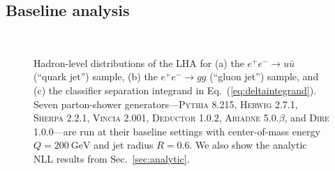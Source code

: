 \documentclass[11pt,letterpaper]{article}
\newcommand{\GeV}{\text{GeV}}
\DeclareRobustCommand{\Sec}[1]{Sec.~\ref{#1}}
\DeclareRobustCommand{\Eq}[1]{Eq.~(\ref{#1})}
\begin{document}
\subsection{Baseline analysis}

\begin{figure}
\centering
{}
$\qquad$

\caption{Hadron-level distributions of the LHA for (a) the $e^+ e^- \to u \bar{u}$ (``quark jet'') sample, (b) the $e^+ e^- \to gg$ (``gluon jet'') sample, and (c) the classifier separation integrand in \Eq{eq:deltaintegrand}.  Seven parton-shower generators---\textsc{Pythia 8.215}, \textsc{Herwig 2.7.1}, \textsc{Sherpa 2.2.1}, \textsc{Vincia 2.001}, \textsc{Deductor 1.0.2}, \textsc{Ariadne 5.0.$\beta$}, and \textsc{Dire 1.0.0}---are run at their baseline settings with center-of-mass energy $Q = 200~\GeV$ and jet radius $R= 0.6$.  We also show the analytic NLL results from \Sec{sec:analytic}.}
\label{fig:LHA_hadron}
\end{figure}
\end{document}
